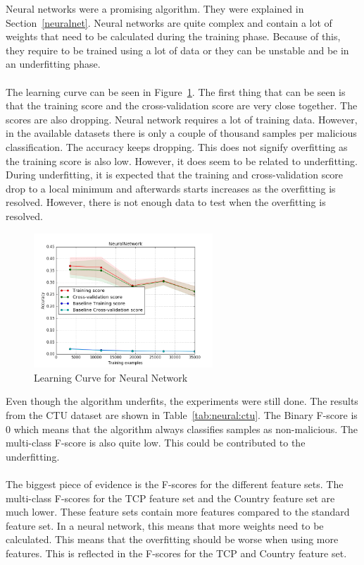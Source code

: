 Neural networks were a promising algorithm. They were explained in Section~\ref{neuralnet}. Neural networks are quite complex and contain a lot of weights that need to be calculated during the training phase. Because of this, they require to be trained using a lot of data or they can be unstable and be in an underfitting phase. \\
\\
The learning curve can be seen in Figure~\ref{fig:neural}. The first thing that can be seen is that the training score and the cross-validation score are very close together. The scores are also dropping. Neural network requires a lot of training data. However, in the available datasets there is only a couple of thousand samples per malicious classification. The accuracy keeps dropping. This does not signify overfitting as the training score is also low. However, it does seem to be related to underfitting. During underfitting, it is expected that the training and cross-validation score drop to a local minimum and afterwards starts increases as the overfitting is resolved. However, there is not enough data to test when the overfitting is resolved.

 \begin{figure}[H]
\centering
\includegraphics[width=0.6\textwidth]{Figures/NeuralNetwork}
\decoRule
\caption[Learning Curve for Neural Network]{Learning Curve for Neural Network}
\label{fig:neural}
\end{figure}

\noindent Even though the algorithm underfits, the experiments were still done. The results from the CTU dataset are shown in Table~\ref{tab:neural:ctu}. The Binary F-score is $0$ which means that the algorithm always classifies samples as non-malicious. The multi-class F-score is also quite low. This could be contributed to the underfitting. \\
\\
The biggest piece of evidence is the F-scores for the different feature sets. The multi-class F-scores for the TCP feature set and the Country feature set are much lower. These feature sets contain more features compared to the standard feature set. In a neural network, this means that more weights need to be calculated. This means that the overfitting should be worse when using more features. This is reflected in the F-scores for the TCP and Country feature set.

